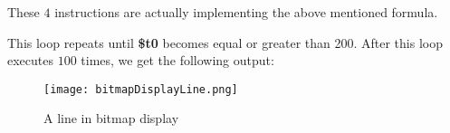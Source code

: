 \documentclass{article}
\begin{document}
These $4$ instructions are actually implementing the above mentioned formula.

This loop repeats until \textbf{\$t0} becomes equal or greater than 200.
\newpage
After this loop executes $100$ times, we get the following output:

\begin{figure}[h]
\centering
\texttt{[image: bitmapDisplayLine.png]}
\caption{A line in bitmap display}
\label{fig:example}
\end{figure}
\end{document}
